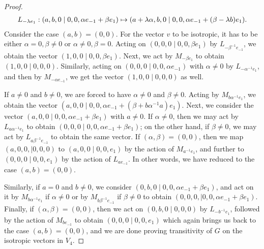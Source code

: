 \begin{proof}
\begin{equation*}
\begin{array}{r@{\;}c@{\;}l}
			L_{-\lambda e_{1}} :  (a, b, 0 \mid 0,0, \alpha e_{-1} + \beta e_{1}) & \mapsto & 
						 (a + \lambda \alpha, b , 0 \mid 0,0, \alpha e_{-1} + (\beta - \lambda b) e_{1}). 
		\end{array}
	\end{equation*}
	Consider the case $(a, b) = (0,0)$. For the
	vector $v$ to be isotropic, it has to be either $\alpha = 0, \beta \neq 0$ or 
	$\alpha \neq 0, \beta = 0$. Acting on $(0,0,0\mid 0,0,\beta e_1)$ by $L_{-\beta^{-1} e_{-1}}$, we obtain the vector
	$(1,0,0 \mid 0,0,\beta e_1)$. Next, we act by $M_{-\beta e_1}$ to obtain $(1,0,0 \mid 0,0,0)$. Similarly,
	acting on $(0,0,0 \mid 0,0,\alpha e_{-1})$ with $\alpha \neq 0$ by $L_{-\alpha^{-1} e_{1}}$, and then by $M_{-\alpha e_{-1}}$, 
	we get the vector $(1,0,0 \mid 0,0,0)$ as well.
	
	If $a \neq 0$ and $b \neq 0$, we are forced to have $\alpha \neq 0$ and $\beta \neq 0$. Acting by $M_{b \alpha^{-1} e_{1}}$, 
	we obtain the vector $(a,0,0 \mid 0,0, \alpha e_{-1} + (\beta + b \alpha^{-1} a) e_1)$. Next, we consider the vector \mbox{$(a,0,0 \mid 0,0, \alpha e_{-1} + \beta e_{1})$}
	with $a \neq 0$. If $\alpha \neq 0$, then we may act by $L_{a\alpha^{-1} e_1}$ to obtain $(0,0,0 \mid 0,0,\alpha e_{-1} + \beta e_1)$; on the other hand,
	if $\beta \neq 0$, we may act by $L_{a\beta^{-1} e_{-1}}$ to obtain the same vector. If $(\alpha, \beta) = (0,0)$, then we map 
	$(a,0,0, \mid 0,0,0)$ to $(a,0,0 \mid 0,0,e_1)$ by the action of $M_{a^{-1} e_1}$, and further to $(0,0,0 \mid 0,0,e_1)$ by the action of $L_{a e_{-1}}$. 
	In other words, we have reduced to the case $(a, b) = (0, 0)$. 
	
	Similarly, if $a = 0$ and $b \neq 0$, we consider $(0,b,0 \mid 0,0, \alpha e_{-1} + \beta e_1)$, and act on it by $M_{b\alpha^{-1} e_1}$ if $\alpha \neq 0$
	or by $M_{b\beta^{-1} e_{-1}}$ if $\beta \neq 0$ to obtain $(0,0,0, \mid 0,0,\alpha e_{-1} + \beta e_1)$. Finally, if $(\alpha, \beta) = (0, 0)$, then
	we act on $(0,b,0 \mid 0,0,0)$ by $L_{-b^{-1} e_1}$, followed by the action of $M_{b e_{-1}}$ to obtain $(0,0,0 \mid 0,0,e_1)$ which again 
	brings us back to the case $(a, b) = (0,0)$, and we are done proving transitivity of $G$ on the isotropic vectors in $V_4$.
	

\end{proof}
